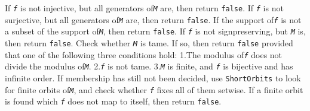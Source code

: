 \documentclass[a4paper,11pt]{report}
\begin{document}
{\begin{description}
 If \mbox{\texttt{\mdseries\slshape f}} is not injective, but all generators of{\nobreakspace}\mbox{\texttt{\mdseries\slshape M}} are, then return \texttt{false}. If \mbox{\texttt{\mdseries\slshape f}} is not surjective, but all generators of{\nobreakspace}\mbox{\texttt{\mdseries\slshape M}} are, then return \texttt{false}. If the support of{\nobreakspace}\mbox{\texttt{\mdseries\slshape f}} is not a subset of the support of{\nobreakspace}\mbox{\texttt{\mdseries\slshape M}}, then return \texttt{false}. If \mbox{\texttt{\mdseries\slshape f}} is not sign\texttt{}preserving, but \mbox{\texttt{\mdseries\slshape M}} is, then return \texttt{false}. Check whether \mbox{\texttt{\mdseries\slshape M}} is tame. If so, then return \texttt{false} provided that one of the following three conditions hold: 1.{\nobreakspace}The
modulus of{\nobreakspace}\mbox{\texttt{\mdseries\slshape f}} does not divide the modulus of{\nobreakspace}\mbox{\texttt{\mdseries\slshape M}}. 2.{\nobreakspace}\mbox{\texttt{\mdseries\slshape f}} is not tame. 3.{\nobreakspace}\mbox{\texttt{\mdseries\slshape M}} is finite, and \mbox{\texttt{\mdseries\slshape f}} is bijective and has infinite order. If membership has still not been decided,
use \texttt{ShortOrbits} to look for finite orbits of{\nobreakspace}\mbox{\texttt{\mdseries\slshape M}}, and check whether \mbox{\texttt{\mdseries\slshape f}} fixes all of them setwise. If a finite orbit is found which \mbox{\texttt{\mdseries\slshape f}} does not map to itself, then return \texttt{false}. 


\end{description}}
\end{document}
